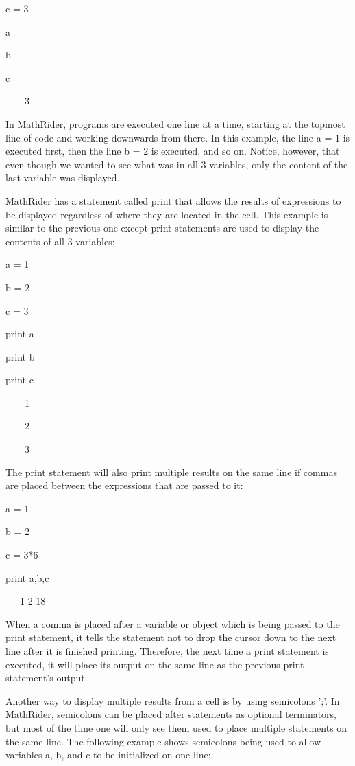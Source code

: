 \documentclass[12pt,oneside]{book}
\begin{document}
c = 3

a

b

c

{\textbar}

\ \ \ \ 3


In MathRider, programs are executed one line at a time, starting at the topmost line of code and working downwards from there. In this example, the line a = 1 is executed first, then the line b = 2 is executed, and so on. Notice, however, that even though we wanted to see what was in all 3 variables, only the content of the last variable was displayed. 

MathRider has a statement called print that allows the results of expressions to be displayed regardless of where they are located in the cell. This example is similar to the previous one except print statements are used to display the contents of all 3 variables: 

a = 1

b = 2

c = 3

print a

print b

print c

{\textbar}

\ \ \ \ 1

\ \ \ \ 2

\ \ \ \ 3


The print statement will also print multiple results on the same line if commas are placed between the expressions that are passed to it:


a = 1

b = 2

c = 3*6

print a,b,c

{\textbar}

\ \ \ 1 2 18


When a comma is placed after a variable or object which is being passed to the print statement, it tells the statement not to drop the cursor down to the next line after it is finished printing. Therefore, the next time a print statement is executed, it will place its output on the same line as the previous print statement's output.


Another way to display multiple results from a cell is by using semicolons ';'. In MathRider, semicolons can be placed after statements as optional terminators, but most of the time one will only see them used to place multiple statements on the same line. The following example shows semicolons being used to allow variables a, b, and c to be initialized on one line:
\end{document}
